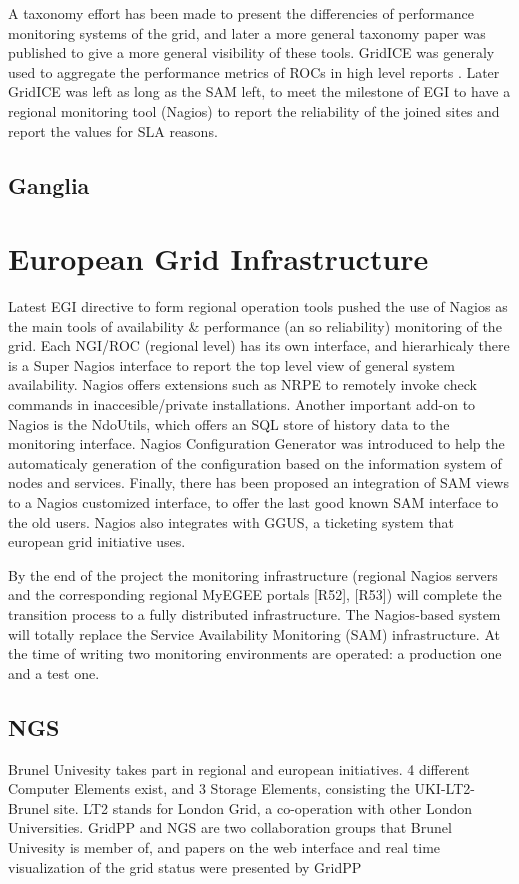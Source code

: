 A taxonomy effort has been made \cite{gerndt2004performance} to present the
differencies of performance monitoring systems of the grid, and later a more
general \cite{zanikolas2007importance} taxonomy paper was published to give a
more general visibility of these tools. GridICE was generaly used to aggregate
the performance metrics of ROCs in high level reports
\cite{andreozzi2005gridice}. Later GridICE was left as long as the SAM left, to
meet the milestone of EGI to have a regional monitoring tool (Nagios) to report
the reliability of the joined sites and report the values for SLA reasons.

\subsection{Ganglia}
\newpage

\section{European Grid Infrastructure}
Latest EGI directive to form regional operation tools pushed the use of Nagios
\cite{imamagic2007grid} as the main tools of availability \& performance (an so
reliability) monitoring of the grid. Each NGI/ROC (regional level) has its own
interface, and hierarhicaly there is a Super Nagios interface to report the top
level view of general system availability. Nagios offers extensions such as NRPE
to remotely invoke check commands in inaccesible/private installations.
Another important add-on to Nagios is the NdoUtils, which offers an SQL store
of history data to the monitoring interface. Nagios Configuration Generator was
introduced to help the automaticaly generation of the configuration based on
the information system of nodes and services. Finally, there has been proposed
an integration of SAM views to a Nagios customized interface, to offer the last
good known SAM interface to the old users. Nagios also integrates with GGUS, a
ticketing system that european grid initiative uses.

By the end of the project the monitoring infrastructure (regional Nagios servers and the corresponding regional MyEGEE portals [R52], [R53]) will complete the transition process to a fully distributed infrastructure.
The Nagios-based system will totally replace the Service Availability Monitoring (SAM)
infrastructure. At the time of writing two monitoring environments are operated: a production one and a test one.
\newpage


\subsection{NGS}
Brunel Univesity takes part in regional and european initiatives. 4 different
Computer Elements exist, and 3 Storage Elements, consisting the UKI-LT2-Brunel
site. LT2 stands for London Grid, a co-operation with other London Universities.
GridPP and NGS are two collaboration groups that Brunel Univesity is member of,
and papers on the web interface \cite{Hobson2007} and real time visualization of
the grid status were presented \cite{Huang2007} by GridPP
